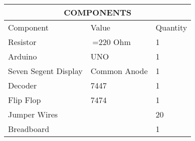 \begin{tabular}{|p{5cm}|p{3cm}|p{2cm}|}
\hline
\multicolumn{3}{|c|}{COMPONENTS}\\
\hline
Component& Value& Quantity\\
\hline
Resistor& $\>$=220 Ohm& 1\\
\hline
Arduino& UNO& 1\\
\hline
Seven Segent Display& Common Anode& 1\\
\hline
Decoder& 7447& 1\\
\hline
Flip Flop& 7474& 1\\
\hline
Jumper Wires&  & 20\\
\hline
Breadboard&  & 1\\
\hline
\end{tabular}
